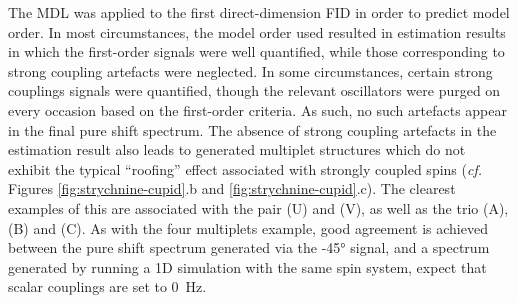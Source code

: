 The \ac{MDL} was applied to the first direct-dimension \ac{FID} in order to
predict model order. In most circumstances, the model order used resulted
in estimation results in which the first-order signals were well
quantified, while those corresponding to strong coupling artefacts were neglected.
In some circumstances, certain strong couplings signals were quantified, though
the relevant oscillators were purged on every occasion based on the first-order
criteria. As such, no such artefacts appear in the final pure shift spectrum.
The absence of strong coupling artefacts in the estimation result also leads to
generated multiplet structures which do not exhibit the typical ``roofing''
effect associated with strongly coupled spins (\textit{cf.} Figures
\ref{fig:strychnine-cupid}.b and \ref{fig:strychnine-cupid}.c). The clearest
examples of this are associated with the pair (U) and (V), as well as the trio (A),
(B) and (C). As with the four multiplets example, good agreement is achieved
between the pure shift spectrum generated via the \ang{-45} signal, and a
spectrum generated by running a \ac{1D} simulation with the same spin system,
expect that scalar couplings are set to \qty{0}{\hertz}.

